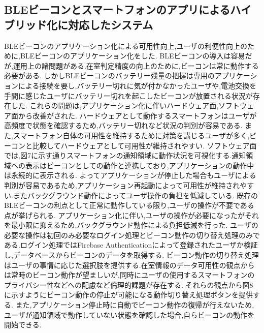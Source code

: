 
\subsection{BLEビーコンとスマートフォンのアプリによるハイブリッド化に対応したシステム}
BLEビーコンのアプリケーション化による可用性向上,ユーザの利便性向上のために,BLEビーコンのアプリケーション化をした.
BLEビーコンの導入は容易だが,運用上の諸問題がある.在室判定精度の向上のために,ビーコンは常に動作する必要がある.
しかしBLEビーコンのバッテリー残量の把握は専用のアプリケーションによる接続を要し,バッテリー切れに気が付かなかったユーザや,電池交換を手間に感じたユーザにバッテリー切れを起こしたビーコンが放置される状況が存在した.
これらの問題は,アプリケーション化に伴いハードウェア面,ソフトウェア面から改善がされた.
ハードウェアとして動作するスマートフォンはユーザが高頻度で状態を確認するため,バッテリー切れなど状況の判別が容易である.
また,スマートフォン自体の可用性を維持するために対策を講じるユーザが多く,ビーコンと比較してハードウェアとして可用性が維持されやすい.
ソフトウェア面では,図7に示す通りスマートフォンの通知領域に動作状況を可視化する.通知領域への表示はビーコンとしての動作と連携しており,アプリケーションの動作中は永続的に表示される.
よってアプリケーションが停止した場合もユーザによる判別が容易であるため,アプリケーション再起動によって可用性が維持されやすい.またバックグラウンド動作によってユーザ操作の負担を低減している.
既存のBLEビーコンの利点として正常に動作している限り,ユーザの操作が不要である点が挙げられる.
アプリケーション化に伴い,ユーザの操作が必要になったがそれを最小限に抑えるため,バックグラウンド動作による負担低減を行った.
ユーザの必要な操作は初回のみ必要なログイン処理とビーコン動作の切り替え処理のみである.ログイン処理ではFirebase Authenticationによって登録されたユーザか検証し,データベースからビーコンのデータを取得する.
ビーコン動作の切り替え処理はユーザの事情に応じた選択肢を提供する.在室情報のデータ可用性の観点からは常時のビーコン動作が望ましいが,同時にユーザの使用するスマートフォンのプライバシー性などへの配慮など倫理的課題が存在する.
それらの観点から図8に示すようにビーコン動作の停止が可能になる動作切り替え処理ボタンを提供する.
また,アプリケーション停止時に自動でビーコン動作の復帰が行えないため,ユーザが通知領域で動作していない状態を確認した場合,自らビーコンの動作を開始できる.